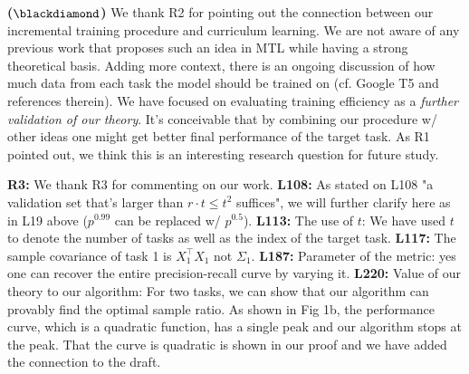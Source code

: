 \documentclass{article}
\begin{document}
\vspace{-0.045in}
\textbf{($\blackdiamond$)}  We thank R2 for pointing out the connection between our incremental training procedure and curriculum learning.
We are not aware of any previous work that proposes such an idea in MTL while having a strong theoretical basis.
Adding more context, there is an ongoing discussion of how much data from each task the model should be trained on (cf. Google T5 and references therein).
We have focused on evaluating training efficiency as a \textit{further validation of our theory}.
It's conceivable that by combining our procedure w/ other ideas one might get better final performance of the target task.
As R1 pointed out, we think this is an interesting research question for future study.

\vspace{-0.025in}
\textbf{R3:}
We thank R3 for commenting on our work.
\textbf{L108:}
As stated on L108  "a validation set that's larger than $r\cdot t \le t^2$ suffices", we will further clarify here as in L19 above ($p^{0.99}$ can be replaced w/ $p^{0.5}$).
\textbf{L113:} The use of $t$: We have used $t$ to denote the number of tasks as well as the index of the target task.
\textbf{L117:} The sample covariance of task 1 is  $X_1^{\top}X_1$ not $\Sigma_1$.
\textbf{L187:} Parameter of the metric: yes one can recover the entire precision-recall curve by varying it.
\textbf{L220:} Value of our theory to our algorithm:
For two tasks, we can show that our algorithm can provably find the optimal sample ratio. As shown in Fig 1b, the performance curve, which is a quadratic function, has a single peak and our algorithm stops at the peak.
That the curve is quadratic is shown in our proof and we have added the connection to the draft.
\end{document}
